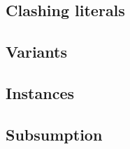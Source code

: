 







\subsection{Clashing literals}

\subsection{Variants}

\subsection{Instances}

\subsection{Subsumption}



